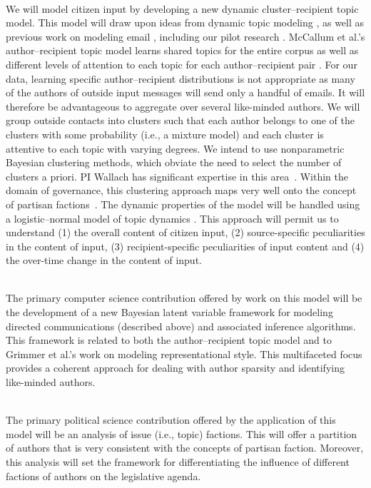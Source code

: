 ~\\
 We will model citizen input by
developing a new dynamic cluster--recipient topic model. This model
will draw upon ideas from dynamic topic modeling \cite{Blei2006}, as
well as previous work on modeling email \cite{McCallum2005}, including
our pilot research \cite{Krafft2012}. McCallum et al.'s
author--recipient topic model learns shared topics for the entire
corpus as well as different levels of attention to each topic for each
author--recipient pair \cite{McCallum2005}. For our data, learning
specific author--recipient distributions is not appropriate as many of
the authors of outside input messages will send only a handful of
emails. It will therefore be advantageous to aggregate over several
like-minded authors. We will group outside contacts into clusters such
that each author belongs to one of the clusters with some probability
(i.e., a mixture model) and each cluster is attentive to each topic
with varying degrees. We intend to use nonparametric Bayesian
clustering methods, which obviate the need to select the number of
clusters a priori. PI Wallach has significant expertise in this
area~\cite{Wallach2008,Wallach2010}. Within the domain of governance,
this clustering approach maps very well onto the concept of partisan
factions~\cite{}. The dynamic properties of the model will be handled using a
logistic--normal model of topic dynamics \cite{Blei2006}. This
approach will permit us to understand (1) the overall content of
citizen input, (2) source-specific peculiarities in the content of
input, (3) recipient-specific peculiarities of input content and (4)
the over-time change in the content of input.

~\\
 The primary computer
science contribution offered by work on this model will be the
development of a new Bayesian latent variable framework for modeling
directed communications (described above) and associated inference
algorithms. This framework is related to both the author--recipient
topic model and to Grimmer et al.'s work on modeling representational
style. This multifaceted focus provides a coherent approach for
dealing with author sparsity and identifying like-minded authors.

~\\
 The primary political science contribution offered by the application of this model will be an analysis of issue (i.e., topic) factions. This will offer a partition of authors that is very consistent with the concepts of partisan faction. Moreover, this analysis will set the framework for differentiating the influence of different factions of authors on the legislative agenda.

